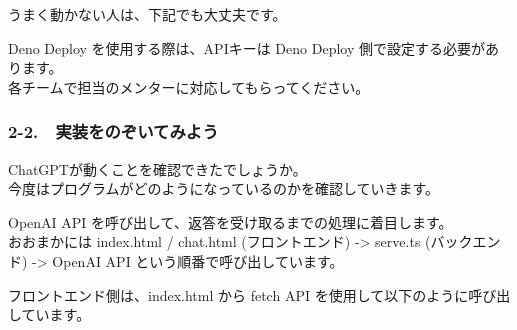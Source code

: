 うまく動かない人は、下記でも大丈夫です。

\begin{Shaded}
\begin{Highlighting}[]
    
\end{Highlighting}
\end{Shaded}

Deno Deploy を使用する際は、APIキーは Deno Deploy
側で設定する必要があります。\\
各チームで担当のメンターに対応してもらってください。

\subsubsection{2-2. 👀
実装をのぞいてみよう}\label{ux5b9fux88c5ux3092ux306eux305eux3044ux3066ux307fux3088ux3046}

ChatGPTが動くことを確認できたでしょうか。\\
今度はプログラムがどのようになっているのかを確認していきます。

OpenAI API を呼び出して、返答を受け取るまでの処理に着目します。\\
おおまかには index.html / chat.html (フロントエンド) -\textgreater{}
serve.ts (バックエンド) -\textgreater{} OpenAI API
という順番で呼び出しています。

フロントエンド側は、index.html から fetch API
を使用して以下のように呼び出しています。

\begin{Shaded}
\begin{Highlighting}[]
\OperatorTok{=}  \NormalTok{(}\OperatorTok{,}\NormalTok{ \{}
  \OperatorTok{:} \OperatorTok{,}
  \OperatorTok{:}\NormalTok{ \{}
    \OperatorTok{:} 
\NormalTok{  \}}\OperatorTok{,}
  \OperatorTok{:} \NormalTok{(\{ }\OperatorTok{:}
\NormalTok{\})}\OperatorTok{;}

\NormalTok{ (}\OperatorTok{!}\NormalTok{) \{}
    \OperatorTok{+}\OperatorTok{;}
\NormalTok{\}}

\OperatorTok{=} \NormalTok{()}\OperatorTok{;}
\OperatorTok{;}
\end{Highlighting}
\end{Shaded}

